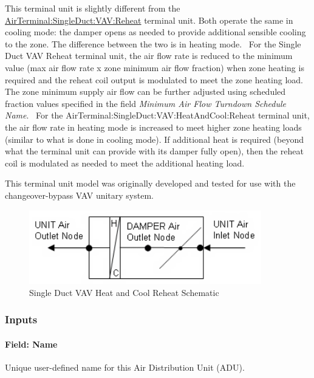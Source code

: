 This terminal unit is slightly different from the \hyperref[airterminalsingleductvavreheat]{AirTerminal:SingleDuct:VAV:Reheat} terminal unit. Both operate the same in cooling mode: the damper opens as needed to provide additional sensible cooling to the zone. The difference between the two is in heating mode.~ For the Single Duct VAV Reheat terminal unit, the air flow rate is reduced to the minimum value (max air flow rate x zone minimum air flow fraction) when zone heating is required and the reheat coil output is modulated to meet the zone heating load. The zone minimum supply air flow can be further adjusted using scheduled fraction values specified in the field \textit{Minimum Air Flow Turndown Schedule Name}.~ For the AirTerminal:SingleDuct:VAV:HeatAndCool:Reheat terminal unit, the air flow rate in heating mode is increased to meet higher zone heating loads (similar to what is done in cooling mode). If additional heat is required (beyond what the terminal unit can provide with its damper fully open), then the reheat coil is modulated as needed to meet the additional heating load.

This terminal unit model was originally developed and tested for use with the changeover-bypass VAV unitary system.

\begin{figure}[hbtp] %
\centering
\includegraphics[width=0.9\textwidth, height=0.9\textheight, keepaspectratio=true]{media/image267.png}
\caption{Single Duct VAV Heat and Cool Reheat Schematic \protect \label{fig:single-duct-vav-heat-and-cool-reheat}}
\end{figure}

\subsubsection{Inputs}\label{inputs-4-000}

\paragraph{Field: Name}\label{field-name-4-000}

Unique user-defined name for this Air Distribution Unit (ADU).


